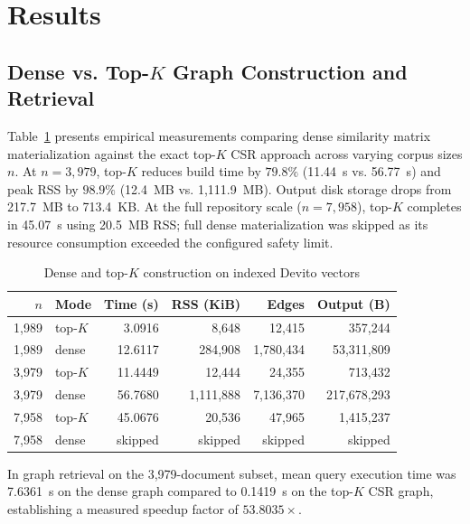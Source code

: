 \documentclass[conference]{IEEEtran}
\begin{document}
\section{Results}
\subsection{Dense vs. Top-$K$ Graph Construction and Retrieval}
Table~\ref{tab:dense} presents empirical measurements comparing dense similarity matrix materialization against the exact top-$K$ CSR approach across varying corpus sizes $n$. At $n=3,979$, top-$K$ reduces build time by $79.8\%$ (11.44~s vs. 56.77~s) and peak RSS by $98.9\%$ (12.4~MB vs. 1,111.9~MB). Output disk storage drops from 217.7~MB to 713.4~KB. At the full repository scale ($n=7,958$), top-$K$ completes in 45.07~s using 20.5~MB RSS; full dense materialization was skipped as its resource consumption exceeded the configured safety limit.

\begin{table}[!t]
\caption{Dense and top-$K$ construction on indexed Devito vectors}
\label{tab:dense}\centering\scriptsize
\setlength{\tabcolsep}{2.5pt}
\begin{tabularx}{\columnwidth}{r l r r r r}\toprule
$n$ & Mode & Time (s) & RSS (KiB) & Edges & Output (B) \\ \midrule
1,989 & top-$K$ & 3.0916 & 8,648 & 12,415 & 357,244 \\
1,989 & dense & 12.6117 & 284,908 & 1,780,434 & 53,311,809 \\
3,979 & top-$K$ & 11.4449 & 12,444 & 24,355 & 713,432 \\
3,979 & dense & 56.7680 & 1,111,888 & 7,136,370 & 217,678,293 \\
7,958 & top-$K$ & 45.0676 & 20,536 & 47,965 & 1,415,237 \\
7,958 & dense & skipped & skipped & skipped & skipped \\
\bottomrule\end{tabularx}
\end{table}

In graph retrieval on the 3,979-document subset, mean query execution time was 7.6361~s on the dense graph compared to 0.1419~s on the top-$K$ CSR graph, establishing a measured speedup factor of $53.8035\times$.
\end{document}
